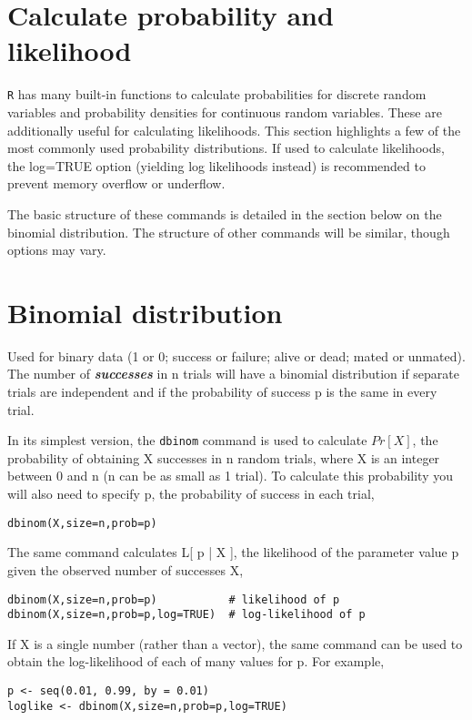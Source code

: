\documentclass[12pt, a4paper]{article}
\theoremstyle{plain}
\theoremstyle{definition}
\theoremstyle{remark}
\begin{document}
\section{Calculate probability and likelihood}
\texttt{R} has many built-in functions to calculate probabilities for discrete random variables and probability densities for continuous random variables. These are additionally useful for calculating likelihoods. This section highlights a few of the most commonly used probability distributions. If used to calculate likelihoods, the log=TRUE option (yielding log likelihoods instead) is recommended to prevent memory overflow or underflow.

The basic structure of these commands is detailed in the section below on the binomial distribution. The structure of other commands will be similar, though options may vary.

\section{Binomial distribution}
Used for binary data (1 or 0; success or failure; alive or dead; mated or unmated). The number of \textbf{\textit{successes}} in n trials will have a binomial distribution if separate trials are independent and if the probability of success p is the same in every trial.

In its simplest version, the \texttt{dbinom} command is used to calculate $Pr[X]$, the probability of obtaining X successes in n random trials, where X is an integer between 0 and n (n can be as small as 1 trial). To calculate this probability you will also need to specify p, the probability of success in each trial,
\begin{framed}
\begin{verbatim}
dbinom(X,size=n,prob=p)
\end{verbatim}
\end{framed}

The same command calculates L[ p | X ], the likelihood of the parameter value p given the observed number of successes X,

\begin{framed}
\begin{verbatim}
dbinom(X,size=n,prob=p)           # likelihood of p
dbinom(X,size=n,prob=p,log=TRUE)  # log-likelihood of p
\end{verbatim}
\end{framed}

If X is a single number (rather than a vector), the same command can be used to obtain the log-likelihood of each of many values for p. For example,
\begin{framed}
\begin{verbatim}
p <- seq(0.01, 0.99, by = 0.01)
loglike <- dbinom(X,size=n,prob=p,log=TRUE)
\end{verbatim}
\end{framed}
\end{document}
